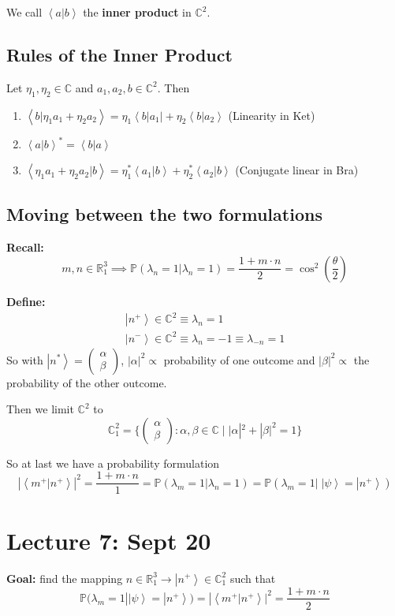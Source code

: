 \documentclass[12pt]{article}
\renewcommand{\P}{\mathbb{P}}
\newcommand{\R}{\mathbb{R}}
\newcommand{\brak}[1]{\left\langle #1 \right\rangle}
\newcommand{\C}{\mathbb{C}}
\newcommand{\bra}[1]{\left\langle #1 \right\vert }
\newcommand{\ket}[1]{\left\vert #1 \right\rangle}
\begin{document}
We call $\brak{a | b}$ the \textbf{inner product} in $\C^2$.

\subsection*{Rules of the Inner Product}
Let $\eta_1, \eta_2 \in \C$ and $a_1, a_2, b \in \C^2$. Then
\begin{enumerate}
    \item $\brak{b | \eta_1 a_1 + \eta_2 a_2} = \eta_1 \bra{b | a_1} + \eta_2 \brak{b | a_2}$ (Linearity in Ket)
    \item $\brak{a | b}^* = \brak{b | a}$
    \item $\brak{\eta_1 a_1 + \eta_2 a_2 | b} = \eta_1^* \brak{a_1 | b} + \eta_2^* \brak{a_2 | b}$ (Conjugate linear in Bra)
\end{enumerate}

\subsection*{Moving between the two formulations}
\textbf{Recall:}
\[m, n \in \R_1^3 \implies \P(\lambda_n = 1 | \lambda_n = 1) = \frac{1+m\cdot n}{2} = \cos^2(\frac{\theta}{2})\]

\textbf{Define:}
\begin{align*}
    \ket{n^+} \in \C^2 \equiv \lambda_n = 1\\
    \ket{n^-} \in \C^2 \equiv \lambda_n = -1 \equiv \lambda_{-n} = 1
\end{align*}
So with $\ket{n^*} = \begin{pmatrix}
    \alpha\\\beta
\end{pmatrix}$, $|\alpha|^2 \propto$ probability of one outcome and $|\beta|^2 \propto$ the probability of the other outcome. 

Then we limit $\C^2$ to 
\[\C^2_1 = \{\begin{pmatrix} \alpha\\\beta \end{pmatrix}: \alpha, \beta \in \C \; | \; |\alpha|^2 + |\beta|^2 = 1\}\]

So at last we have a probability formulation 
\[|\brak{m^+ | n^+}|^2 = \frac{1 + m\cdot n}{1} = \P(\lambda_m = 1 | \lambda_n = 1) = \P(\lambda_m = 1 |\; \ket{\psi} = \ket{n^+})\]

\section*{Lecture 7: Sept 20}
\textbf{Goal:} find the mapping $n \in \R_1^3 \to \ket{n^+} \in \C_1^2$ such that 
\[\P(\lambda_m = 1 | \ket{\psi} = \ket{n^+}) = |\brak{m^+ | n^+}|^2 = \frac{1 + m\cdot n}{2}\]
\end{document}
